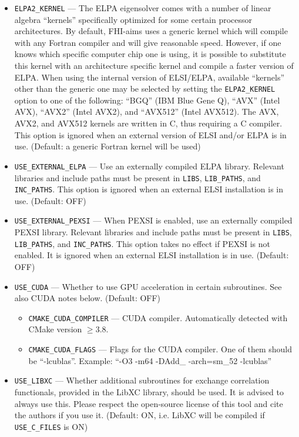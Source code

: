 \begin{itemize}
\item \texttt{ELPA2\_KERNEL} --- The ELPA eigensolver comes with a number of linear algebra ``kernels'' specifically optimized for some certain processor architectures. By default, FHI-aims uses a generic kernel which will compile with any Fortran compiler and will give reasonable speed. However, if one knows which specific computer chip one is using, it is possible to substitute this kernel with an architecture specific kernel and compile a faster version of ELPA. When using the internal version of ELSI/ELPA, available ``kernels'' other than the generic one may be selected by setting the \texttt{ELPA2\_KERNEL} option to one of the following: ``BGQ'' (IBM Blue Gene Q), ``AVX'' (Intel AVX), ``AVX2'' (Intel AVX2), and ``AVX512'' (Intel AVX512). The AVX, AVX2, and AVX512 kernels are written in C, thus requiring a C compiler. This option is ignored when an external version of ELSI and/or ELPA is in use. (Default: a generic Fortran kernel will be used)
\item \texttt{USE\_EXTERNAL\_ELPA} --- Use an externally compiled ELPA library. Relevant libraries and include paths must be present in \texttt{LIBS}, \texttt{LIB\_PATHS}, and \texttt{INC\_PATHS}. This option is ignored when an external ELSI installation is in use. (Default: OFF)
\item \texttt{USE\_EXTERNAL\_PEXSI} --- When PEXSI is enabled, use an externally compiled PEXSI library. Relevant libraries and include paths must be present in \texttt{LIBS}, \texttt{LIB\_PATHS}, and \texttt{INC\_PATHS}. This option takes no effect if PEXSI is not enabled. It is ignored when an external ELSI installation is in use. (Default: OFF)
\item \texttt{USE\_CUDA} --- Whether to use GPU acceleration in certain subroutines. See also CUDA notes below. (Default: OFF)
  \begin{itemize}
  \item \texttt{CMAKE\_CUDA\_COMPILER} --- CUDA compiler. Automatically detected with CMake version $\ge3.8$.
  \item \texttt{CMAKE\_CUDA\_FLAGS} --- Flags for the CUDA compiler. One of them should be ``-lcublas''. Example: ``-O3 -m64 -DAdd\_ -arch=sm\_52 -lcublas''
  \end{itemize}
\item \texttt{USE\_LIBXC} --- Whether additional subroutines for exchange correlation functionals, provided in the LibXC library, should be used. It is advised to always use this. Please respect the open-source license of this tool and cite the authors if you use it. (Default: ON, i.e. LibXC will be compiled if \texttt{USE\_C\_FILES} is ON)

\end{itemize}
